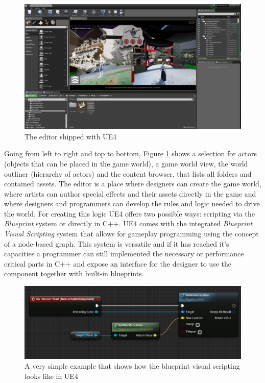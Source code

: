 \begin{figure}[h!]
	\includegraphics[width=\linewidth]{PICs/unreal_ed.png}
	\caption{The editor shipped with \ac{UE4}}
	\label{fig:unreal_ed}
\end{figure}

Going from left to right and top to bottom, Figure \ref{fig:unreal_ed} shows a selection for actors (objects that can be placed in the game world), a game world view, the world outliner (hierarchy of actors) and the content browser, that lists all folders and contained assets. The editor is a place where designers can create the game world, where artists can author special effects and their assets directly in the game
and where designers and programmers can develop the rules and logic needed to drive the world. For creating this logic \ac{UE4} offers two possible ways: scripting via the \textit{Blueprint} system or directly in C++. \ac{UE4} comes with the integrated \textit{Blueprint Visual Scripting} system that allows for gameplay programming using the concept of a node-based graph. This system is versatile and if it has reached it's capacities a programmer can still implemented the necessary or performance critical parts in C++ and expose an interface for the designer to use the component together with built-in blueprints.

\begin{figure}[h!]
	\includegraphics[width=\linewidth]{PICs/ue_blueprints.png}
	\caption{A very simple example that shows how the blueprint visual scripting looks like in \ac{UE4}}
	\label{fig:ue_blueprints}
\end{figure}

